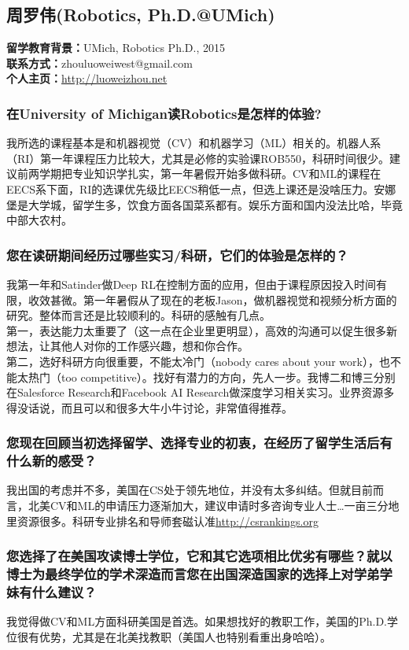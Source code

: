 \documentclass[a4paper,UTF8]{book}
\begin{document}
\clearpage
\subsection{周罗伟(Robotics, Ph.D.@UMich)}
    \textbf{留学教育背景：}UMich, Robotics Ph.D., 2015\\
    \textbf{联系方式：}zhouluoweiwest@gmail.com\\
    \textbf{个人主页：}\url{http://luoweizhou.net}

    \subsubsection*{在University of Michigan读Robotics是怎样的体验?}
    我所选的课程基本是和机器视觉（CV）和机器学习（ML）相关的。机器人系（RI）第一年课程压力比较大，尤其是必修的实验课ROB550，科研时间很少。建议前两学期把专业知识学扎实，第一年暑假开始多做科研。CV和ML的课程在EECS系下面，RI的选课优先级比EECS稍低一点，但选上课还是没啥压力。安娜堡是大学城，留学生多，饮食方面各国菜系都有。娱乐方面和国内没法比哈，毕竟中部大农村。

    \subsubsection*{您在读研期间经历过哪些实习/科研，它们的体验是怎样的？}
    我第一年和Satinder做Deep RL在控制方面的应用，但由于课程原因投入时间有限，收效甚微。第一年暑假从了现在的老板Jason，做机器视觉和视频分析方面的研究。整体而言还是比较顺利的。科研的感触有几点。\\
    第一，表达能力太重要了（这一点在企业里更明显），高效的沟通可以促生很多新想法，让其他人对你的工作感兴趣，想和你合作。\\
    第二，选好科研方向很重要，不能太冷门（nobody cares about your work），也不能太热门（too competitive）。找好有潜力的方向，先人一步。我博二和博三分别在Salesforce Research和Facebook AI Research做深度学习相关实习。业界资源多得没话说，而且可以和很多大牛小牛讨论，非常值得推荐。

    \subsubsection*{您现在回顾当初选择留学、选择专业的初衷，在经历了留学生活后有什么新的感受？}
    我出国的考虑并不多，美国在CS处于领先地位，并没有太多纠结。但就目前而言，北美CV和ML的申请压力逐渐加大，建议申请时多咨询专业人士…一亩三分地里资源很多。科研专业排名和导师套磁认准\url{http://csrankings.org}

    \subsubsection*{您选择了在美国攻读博士学位，它和其它选项相比优劣有哪些？就以博士为最终学位的学术深造而言您在出国深造国家的选择上对学弟学妹有什么建议？}
    我觉得做CV和ML方面科研美国是首选。如果想找好的教职工作，美国的Ph.D.学位很有优势，尤其是在北美找教职（美国人也特别看重出身哈哈）。
\end{document}
